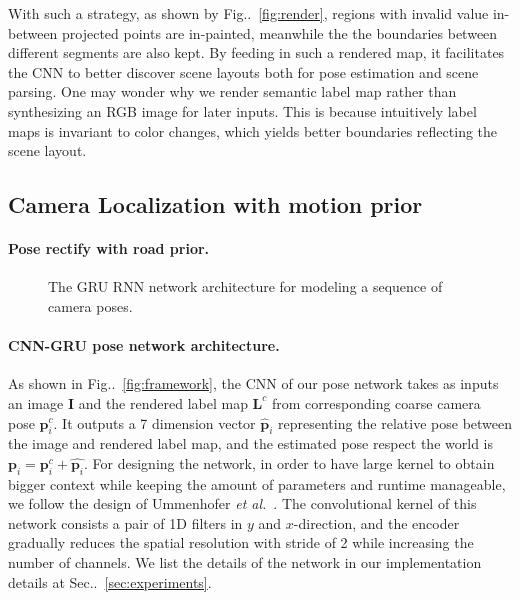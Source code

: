 \documentclass[10pt,twocolumn,letterpaper]{article}
\makeatletter
\newcommand{\figref}[1]{Fig\onedot~\ref{#1}}
\newcommand{\secref}[1]{Sec\onedot~\ref{#1}}
\newcommand{\ve}[1]{{\mathbf #1}} %
\DeclareRobustCommand\onedot{\futurelet\@let@token\@onedot}
\def\onedot{\ifx\@let@token.\else.\null\fi\xspace}
\def\etal{\emph{et al.}}
\makeatother
\begin{document}
With such a strategy, as shown by \figref{fig:render}, regions with invalid value in-between projected points are in-painted, meanwhile the the boundaries between different segments are also kept. By feeding in such a rendered map, it facilitates the CNN to better discover scene layouts both for pose estimation and scene parsing.
One may wonder why we render semantic label map rather than synthesizing an RGB image for later inputs. 
This is because intuitively label maps is invariant to color changes, which yields better boundaries reflecting the scene layout. 

\subsection{Camera Localization with motion prior}
\paragraph{Pose rectify with road prior.} 

\begin{figure}[t]
\begin{center}
\fbox{\rule{0pt}{2in} \rule{0.9\linewidth}{0pt}}
\end{center}
   \caption{The GRU RNN network architecture for modeling a sequence of camera poses.}
\label{fig:rnn}
\end{figure}

\paragraph{CNN-GRU pose network architecture.} 
As shown in \figref{fig:framework}, the CNN of our pose network takes as inputs an image $\ve{I}$ and the rendered label map $\ve{L}^c$ from corresponding coarse camera pose $\ve{p}_i^c$. It outputs a 7 dimension vector $\hat{\ve{p}}_i$ representing the relative pose between the image and rendered label map, and the estimated pose respect the world is $\ve{p}_i = \ve{p}_i^c + \hat{\ve{p}_i}$.
For designing the network, in order to have large kernel to obtain bigger context while keeping the amount of parameters and runtime manageable, we follow the design of Ummenhofer \etal~\cite{}. The convolutional kernel of this network consists a pair of 1D filters in $y$ and $x$-direction, and the encoder gradually reduces the spatial resolution with stride of 2 while increasing the number of channels. We list the details of the network in our implementation details at \secref{sec:experiments}.
\end{document}
